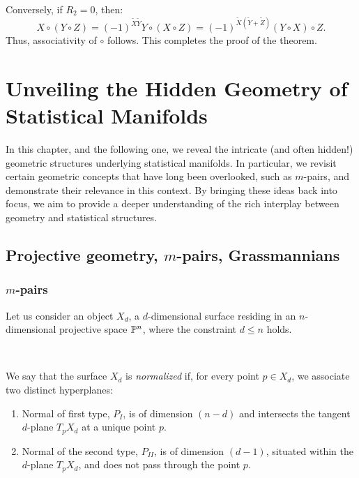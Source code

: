 Conversely, if $R_2 = 0$, then:
\[
X \circ (Y \circ Z) = (-1)^{\tilde{X} \tilde{Y}} Y \circ (X \circ Z) = (-1)^{\tilde{X} (\tilde{Y} + \tilde{Z})} (Y \circ X) \circ Z.
\]
Thus, associativity of $\circ$ follows. This completes the proof of the theorem.




\chapter{Unveiling the Hidden Geometry of Statistical Manifolds}
In this chapter, and the following one, we reveal the intricate (and often hidden!) geometric structures underlying statistical manifolds. In particular, we revisit certain geometric concepts that have long been overlooked, such as $m$-pairs, and demonstrate their relevance in this context. By bringing these ideas back into focus, we aim to provide a deeper understanding of the rich interplay between geometry and statistical structures.
\section{Projective geometry, $m$-pairs, Grassmannians}
\subsection{$m$-pairs}\label{S:4.3}
Let us consider an object $X_{d}$, a $d$-dimensional surface residing in an $n$-dimensional projective space $\mathbb{P}^{n}$, where the constraint $d \leq n$ holds. 

\, 


\begin{definition}
We say that the surface $X_{d}$ is \textit{normalized} if, for every point $p \in X_{d}$, we associate two distinct hyperplanes:
\begin{enumerate}
\item Normal of first type, $P_{I}$, is of dimension $(n-d)$ and intersects the tangent $d$-plane $T_{p}X_{d}$ at a unique point $p$.
\item Normal of the second type, $P_{II}$, is of dimension $(d-1)$, situated  within the $d$-plane $T_{p}X_d$, and does not pass through the point $p$.
\end{enumerate}
\end{definition}


